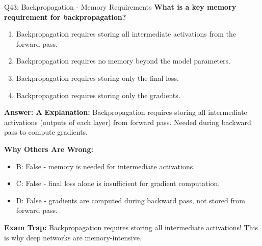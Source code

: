 \documentclass[8pt]{beamer}
\begin{document}
	\begin{frame}{Q43: Backpropagation - Memory Requirements}
		\fontsize{6.5}{7.5}\selectfont
		\textbf{What is a key memory requirement for backpropagation?}
		
		\begin{enumerate}
			\item Backpropagation requires storing all intermediate activations from the forward pass.
			\item Backpropagation requires no memory beyond the model parameters.
			\item Backpropagation requires storing only the final loss.
			\item Backpropagation requires storing only the gradients.
		\end{enumerate}
		
		\vspace{0.05cm}
		\textcolor{myblue}{\textbf{Answer: A}}
		\vspace{0.05cm}
		\textcolor{myblue}{\textbf{Explanation:}} Backpropagation requires storing all intermediate activations (outputs of each layer) from forward pass. Needed during backward pass to compute gradients.
		
		\vspace{0.05cm}
		\textcolor{myred}{\textbf{Why Others Are Wrong:}}
		\begin{itemize}
			\item \textcolor{myred}{B:} False - memory is needed for intermediate activations.
			\item \textcolor{myred}{C:} False - final loss alone is insufficient for gradient computation.
			\item \textcolor{myred}{D:} False - gradients are computed during backward pass, not stored from forward pass.
		\end{itemize}
		
		\textcolor{myred}{\textbf{Exam Trap:}} Backpropagation requires storing \textcolor{myblue}{all intermediate activations}! This is why deep networks are memory-intensive.
	\end{frame}
	
\end{document}
